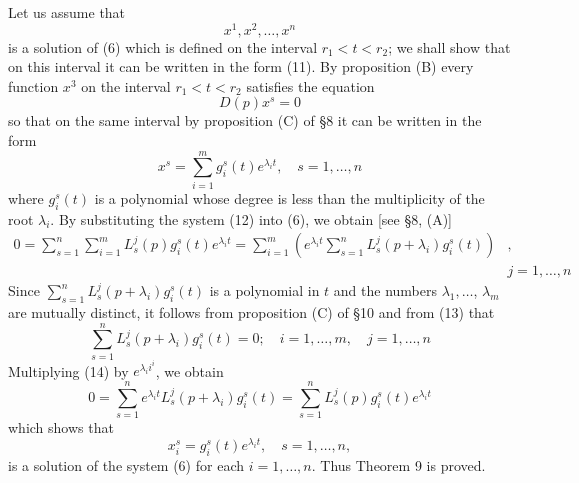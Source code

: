 \documentclass[10pt,a5paper]{book}
\makeatletter
\theoremstyle{plain}
\theoremstyle{definition}
\theoremstyle{remark}
\renewenvironment{proof}[1][\proofname]{\par
  \pushQED{\qed}%
  \normalfont\topsep6\p@\@plus6\p@\relax
  \trivlist
  \item\relax{\itshape #1\@addpunct{.}}\hspace\labelsep\ignorespaces
}{\popQED\endtrivlist\@endpefalse}
\makeatother
\begin{document}
\begin{proof}
Let us assume that
\[
x^{1}, x^{2}, \ldots, x^{n}
\]
is a solution of (6) which is defined on the interval $r_{1}<t<r_{2}$; we shall show that on this interval it can be written in the form (11). By proposition (B) every function $x^{3}$ on the interval $r_{1}<t<r_{2}$ satisfies the equation
\[
D(p) x^{s}=0
\]
so that on the same interval by proposition (C) of §8 it can be written in the form
\begin{equation*}
x^{s}=\sum_{i=1}^{m} g_{i}^{s}(t) e^{\lambda_{i} t}, \quad s=1, \ldots, n \tag{12}
\end{equation*}
where $g_{i}^{s}(t)$ is a polynomial whose degree is less than the multiplicity of the root $\lambda_{i}$. By substituting the system (12) into (6), we obtain [see §8, (A)]
\begin{align*}
0=\sum_{s=1}^{n} \sum_{i=1}^{m} L_{s}^{j}(p) g_{i}^{s}(t) e^{\lambda_{i} t}=\sum_{i=1}^{m}\left(e^{\lambda_{i} t} \sum_{s=1}^{n} L_{s}^{j}\left(p+\lambda_{i}\right) g_{i}^{s}(t)\right) & , \\
& j=1, \ldots, n \tag{13}
\end{align*}
Since $\sum_{s=1}^{n} L_{s}^{j}\left(p+\lambda_{i}\right) g_{i}^{s}(t)$ is a polynomial in $t$ and the numbers $\lambda_{1}, \ldots$, $\lambda_{m}$ are mutually distinct, it follows from proposition (C) of §10 and from (13) that
\begin{equation*}
\sum_{s=1}^{n} L_{s}^{j}\left(p+\lambda_{i}\right) g_{i}^{s}(t)=0 ; \quad i=1, \ldots, m, \quad j=1, \ldots, n \tag{14}
\end{equation*}
Multiplying (14) by $e^{\lambda_{i} i^{i}}$, we obtain
\[
0=\sum_{s=1}^{n} e^{\lambda_{i} t} L_{s}^{j}\left(p+\lambda_{i}\right) g_{i}^{s}(t)=\sum_{s=1}^{n} L_{s}^{j}(p) g_{i}^{s}(t) e^{\lambda_{i} t}
\]
which shows that
\[
x_{i}^{s}=g_{i}^{s}(t) e^{\lambda_{i} t}, \quad s=1, \ldots, n,
\]
is a solution of the system (6) for each $i=1, \ldots, n$. Thus Theorem 9 is proved.
\end{proof}
\end{document}
